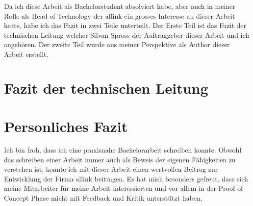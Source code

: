 Da ich diese Arbeit als Bachelorstudent absolviert habe, aber auch in meiner Rolle als Head of Technology der allink ein grosses Interesse an dieser Arbeit hatte, habe ich das Fazit in zwei Teile unterteilt. Der Erste Teil ist das Fazit der technischen Leitung welcher Silvan Spross der Auftraggeber dieser Arbeit und ich angehören. Der zweite Teil wurde aus meiner Perspektive als Author dieser Arbeit erstellt.

\section{Fazit der technischen Leitung}
\label{sec:fazit_der_technischen_leitung}

\section{Personliches Fazit}
\label{sec:personliches_fazit}
Ich bin froh, dass ich eine praxisnahe Bachelorarbeit schreiben konnte. Obwohl das schreiben einer Arbeit immer auch als Beweis der eigenen Fähigkeiten zu verstehen ist, konnte ich mit dieser Arbeit einen wertvollen Beitrag zur Entwicklung der Firma allink beitragen. Es hat mich besonders gefreut, dass sich meine Mitarbeiter für meine Arbeit interessierten und vor allem in der Proof of Concept Phase micht mit Feedback und Kritik unterstützt haben.
